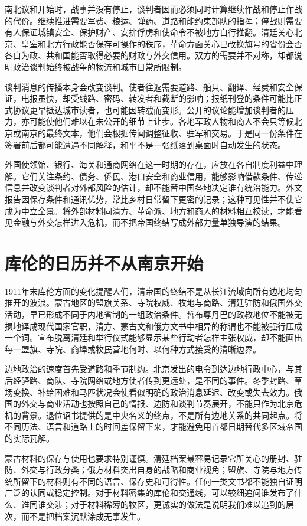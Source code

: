南北议和开始时，战事并没有停止，谈判者因而必须同时计算继续作战和停止作战的代价。继续推进需要军费、粮运、弹药、道路和能约束部队的指挥；停战则需要有人保证城镇安全、保护财产、安排俘虏和使命令不被地方自行推翻。清廷关心北京、皇室和北方行政能否保存可操作的秩序，革命方面关心已改换旗号的省份会否各自为政、共和国能否取得必要的财政与外交信用。双方的需要并不对称，却都说明政治谈判始终被战争的物流和城市日常所限制。

谈判消息的传播本身会改变谈判。使者往返需要道路、船只、翻译、经费和安全保证，电报虽快，却受线路、密码、转发者和截断的影响；报纸刊登的条件可能比正式协议更早抵达城市读者，也可能因转载而变形。公开的议论能增加谈判者的压力，亦可能使他们难以在未公开的细节上让步。各地军政人物和商人不会只等候北京或南京的最终文本，他们会根据传闻调整征收、驻军和交易。于是同一份条件在签署前后都可能遭遇不同解释，和平不是一张纸落到桌面时自动发生的状态。

外国使领馆、银行、海关和通商网络在这一时期的存在，应放在各自制度利益中理解。它们关注条约、债务、侨民、港口安全和商业信用，能够影响借款条件、传递信息并改变谈判者对外部风险的估计，却不能替中国各地决定谁有统治能力。外文报告因保存条件和通讯优势，常比乡村日常留下更密的记录；这种可见性并不使它成为中立全景。将外部材料同清方、革命派、地方和商人的材料相互校读，才能看见金融与外交怎样进入危机，而不把帝国终结写成外部力量单独导演的结果。

\section{库伦的日历并不从南京开始}

1911年末库伦方面的变化提醒人们，清帝国的终结不是从长江流域向所有边地均匀推开的波浪。蒙古地区的盟旗关系、寺院权威、牧地与商路、清廷驻防和俄国外交活动，早已形成不同于内地省制的一组政治条件。哲布尊丹巴的政教地位不能被无损地译成现代国家官职，清方、蒙古文和俄方文书中相异的称谓也不能被强行压成一个词。宣布脱离清廷和举行仪式能够显示某些行动者怎样主张权威，却不能画出每一盟旗、寺院、商埠或牧民营地何时、以何种方式接受的清晰边界。

边地政治的速度首先受道路和季节制约。北京发出的电令到达边地行政中心，与其后经驿路、商队、寺院网络或地方使者传到更远处，是不同的事件。冬季封路、草场变换、补给困难和马匹状况会使看似明确的政治消息延迟、改变或失去效力。俄国的外交与商业活动也按照自己的情报、边防和谈判节奏展开，不能只作为北京危机的背景。退位诏书提供的是中央名义的终点，不是所有边地关系的共同起点。将不同历法、语言和道路上的时间差保留下来，才能避免用首都日期替代多区域帝国的实际瓦解。

蒙古材料的保存与使用也要求特别谨慎。清廷档案最容易记录它所关心的册封、驻防、外交与行政分类；俄方材料突出自身的战略和商业视角；盟旗、寺院与地方传统所留下的材料则有不同的语言、保存史和可得性。任何一类文书都不能独自证明广泛的认同或稳定控制。对于材料密集的库伦和交通线，可以较细追问谁发布了什么、谁同谁交涉；对于材料稀薄的牧区，更诚实的做法是说明我们难以追到的层次，而不是把档案沉默涂成无事发生。

